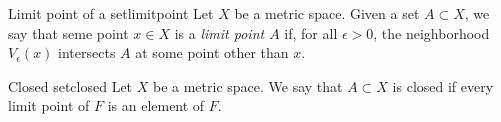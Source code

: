 
\begin{defn}{Limit point of a set}{limitpoint}
	Let \(X\) be a metric space. Given a set \(A \subset X\), we say that seme point \(x \in X\) is a \emph{limit point \(A\)} if, for all  \(\epsilon > 0\), the neighborhood \(V_\epsilon(x)\) intersects \(A\) at some point other than \(x\).
\end{defn}

\begin{defn}{Closed set}{closed}
	Let \(X\) be a metric space.
	We say that \(A \subset X\) is closed if every limit point of \(F\) is an element of \(F\).
\end{defn}
